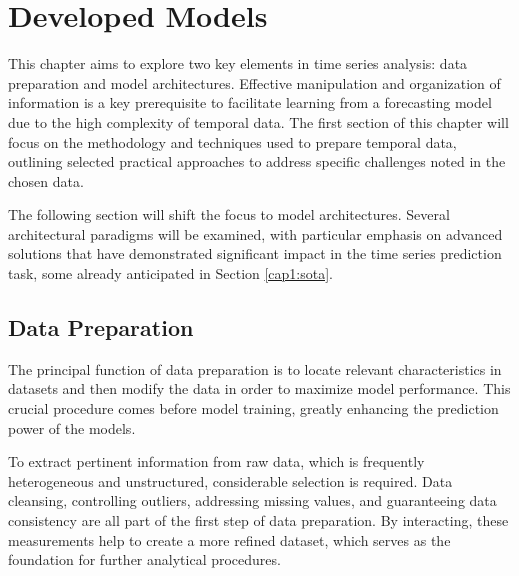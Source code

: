 \chapter{Developed Models}
\label{chap:Models}

This chapter aims to explore two key elements in time series analysis: data preparation and model architectures. Effective manipulation and organization of information is a key prerequisite to facilitate learning from a forecasting model due to the high complexity of temporal data. The first section of this chapter will focus on the methodology and techniques used to prepare temporal data, outlining selected practical approaches to address specific challenges noted in the chosen data.

The following section will shift the focus to model architectures. Several architectural paradigms will be examined, with particular emphasis on advanced solutions that have demonstrated significant impact in the time series prediction task, some already anticipated in Section \ref{cap1:sota}.

\section{Data Preparation}
\label{sec:DataPreparation}

The principal function of data preparation is to locate relevant characteristics in datasets and then modify the data in order to maximize model performance. This crucial procedure comes before model training, greatly enhancing the prediction power of the models.

To extract pertinent information from raw data, which is frequently heterogeneous and unstructured, considerable selection is required. Data cleansing, controlling outliers, addressing missing values, and guaranteeing data consistency are all part of the first step of data preparation. By interacting, these measurements help to create a more refined dataset, which serves as the foundation for further analytical procedures.

